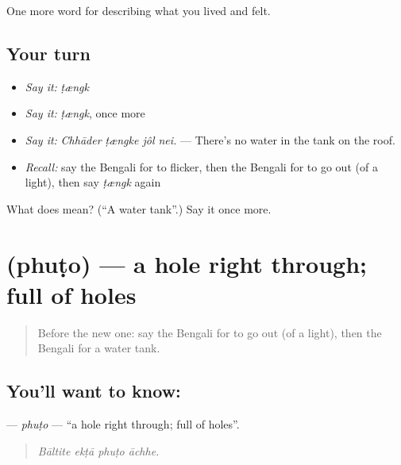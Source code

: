 \begin{grammarlens}[title={What you've built}]
One more word for describing what you lived and felt.
\end{grammarlens}

\subsection*{Your turn}
\begin{itemize}
\raggedright
  \item \emph{Say it:} \emph{ṭængk}
  \item \emph{Say it:} \emph{ṭængk}, once more
  \item \emph{Say it:} \emph{Chhāder ṭængke jôl nei.} — There's no water in the tank on the roof.
  \item \emph{Recall:} say the Bengali for to flicker, then the Bengali for to go out (of a light), then say \emph{ṭængk} again
\end{itemize}

\begin{tcolorbox}[breakable,colback=teal!4,colframe=teal!35!black,title={Before you move on}]
What does  mean? (\textquotedblleft{}A water tank\textquotedblright{}.) Say it once more.
\end{tcolorbox}
\section[\texorpdfstring{\bn{ফুটো} (phuṭo)}{ফুটো (phuṭo)}]{ (phuṭo) — a hole right through; full of holes}

\label{lesson:BN-C506-phuto}



\begin{quote}
Before the new one: say the Bengali for to go out (of a light), then the Bengali for a water tank.
\end{quote}

\subsection*{You'll want to know: }
\textbf{} — \emph{phuṭo} — \textquotedblleft{}a hole right through; full of holes\textquotedblright{}.

\begin{quote}
   
\end{quote}

\begin{quote}
\emph{Bāltite ekṭā phuṭo āchhe.}
\end{quote}

